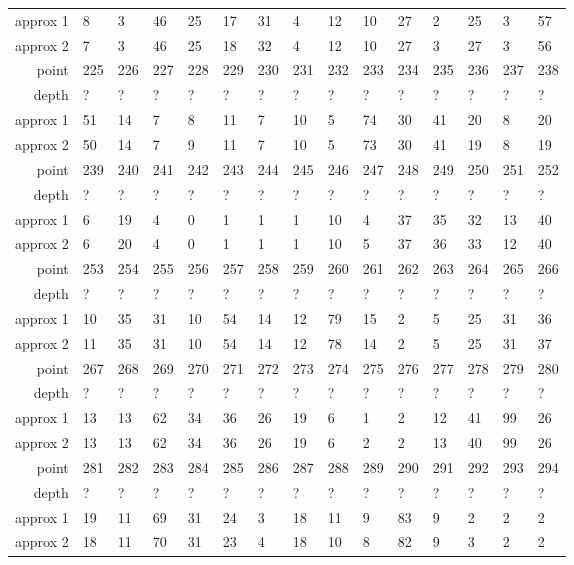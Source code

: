\begin{center}
\begin{supertabular}{|r|l l l l l l l l l l l l l l|}
approx 1 & 8 & 3 & 46 & 25 & 17 & 31 & 4 & 12 & 10 & 27 & 2 & 25 & 3 & 57 \\
approx 2 & 7 & 3 & 46 & 25 & 18 & 32 & 4 & 12 & 10 & 27 & 3 & 27 & 3 & 56 \\
\hline
point & 225 & 226 & 227 & 228 & 229 & 230 & 231 & 232 & 233 & 234 & 235 & 236 & 237 & 238 \\
\hline
depth & ? & ? & ? & ? & ? & ? & ? & ? & ? & ? & ? & ? & ? & ? \\
approx 1 & 51 & 14 & 7 & 8 & 11 & 7 & 10 & 5 & 74 & 30 & 41 & 20 & 8 & 20 \\
approx 2 & 50 & 14 & 7 & 9 & 11 & 7 & 10 & 5 & 73 & 30 & 41 & 19 & 8 & 19 \\
\hline
point & 239 & 240 & 241 & 242 & 243 & 244 & 245 & 246 & 247 & 248 & 249 & 250 & 251 & 252 \\
\hline
depth & ? & ? & ? & ? & ? & ? & ? & ? & ? & ? & ? & ? & ? & ? \\
approx 1 & 6 & 19 & 4 & 0 & 1 & 1 & 1 & 10 & 4 & 37 & 35 & 32 & 13 & 40 \\
approx 2 & 6 & 20 & 4 & 0 & 1 & 1 & 1 & 10 & 5 & 37 & 36 & 33 & 12 & 40 \\
\hline
point & 253 & 254 & 255 & 256 & 257 & 258 & 259 & 260 & 261 & 262 & 263 & 264 & 265 & 266 \\
\hline
depth & ? & ? & ? & ? & ? & ? & ? & ? & ? & ? & ? & ? & ? & ? \\
approx 1 & 10 & 35 & 31 & 10 & 54 & 14 & 12 & 79 & 15 & 2 & 5 & 25 & 31 & 36 \\
approx 2 & 11 & 35 & 31 & 10 & 54 & 14 & 12 & 78 & 14 & 2 & 5 & 25 & 31 & 37 \\
\hline
point & 267 & 268 & 269 & 270 & 271 & 272 & 273 & 274 & 275 & 276 & 277 & 278 & 279 & 280 \\
\hline
depth & ? & ? & ? & ? & ? & ? & ? & ? & ? & ? & ? & ? & ? & ? \\
approx 1 & 13 & 13 & 62 & 34 & 36 & 26 & 19 & 6 & 1 & 2 & 12 & 41 & 99 & 26 \\
approx 2 & 13 & 13 & 62 & 34 & 36 & 26 & 19 & 6 & 2 & 2 & 13 & 40 & 99 & 26 \\
\hline
point & 281 & 282 & 283 & 284 & 285 & 286 & 287 & 288 & 289 & 290 & 291 & 292 & 293 & 294 \\
\hline
depth & ? & ? & ? & ? & ? & ? & ? & ? & ? & ? & ? & ? & ? & ? \\
approx 1 & 19 & 11 & 69 & 31 & 24 & 3 & 18 & 11 & 9 & 83 & 9 & 2 & 2 & 2 \\
approx 2 & 18 & 11 & 70 & 31 & 23 & 4 & 18 & 10 & 8 & 82 & 9 & 3 & 2 & 2 \\

\end{supertabular}
\end{center}
